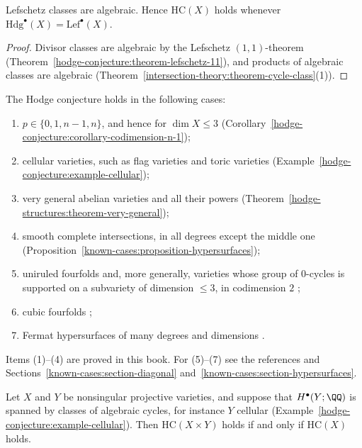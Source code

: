 \begin{proposition}\label{known-cases:proposition-lefschetz-classes}
Lefschetz classes are algebraic. Hence $\mathrm{HC}(X)$ holds whenever $\mathrm{Hdg}^\bullet(X) = \mathrm{Lef}^\bullet(X)$.
\end{proposition}

\begin{proof}
Divisor classes are algebraic by the Lefschetz $(1,1)$-theorem (Theorem~\ref{hodge-conjecture:theorem-lefschetz-11}), and products of algebraic classes are algebraic
(Theorem~\ref{intersection-theory:theorem-cycle-class}(1)).
\end{proof}

\begin{theorem}\label{known-cases:theorem-general}
The Hodge conjecture holds in the following cases:
\begin{enumerate}
\item $p \in \{0, 1, n - 1, n\}$, and hence for $\dim X \leq 3$ (Corollary~\ref{hodge-conjecture:corollary-codimension-n-1});
\item cellular varieties, such as flag varieties and toric varieties (Example~\ref{hodge-conjecture:example-cellular});
\item very general abelian varieties and all their powers (Theorem~\ref{hodge-structures:theorem-very-general});
\item smooth complete intersections, in all degrees except the middle one (Proposition~\ref{known-cases:proposition-hypersurfaces});
\item uniruled fourfolds \cite{conte-murre-1978} and, more generally, varieties whose group of $0$-cycles is supported on a subvariety of dimension $\leq 3$, in codimension $2$
\cite{bloch-srinivas-1983};
\item cubic fourfolds \cite{zucker-1977};
\item Fermat hypersurfaces of many degrees and dimensions \cite{shioda-1979}.
\end{enumerate}
\end{theorem}

Items (1)--(4) are proved in this book. For (5)--(7) see the references and Sections~\ref{known-cases:section-diagonal} and~\ref{known-cases:section-hypersurfaces}.

\begin{proposition}\label{known-cases:proposition-cellular-factor}
Let $X$ and $Y$ be nonsingular projective varieties, and suppose that $H^\bullet(Y; \QQ)$ is spanned by classes of algebraic cycles, for instance $Y$ cellular (Example~\ref{hodge-conjecture:example-cellular}). Then
$\mathrm{HC}(X \times Y)$ holds if and only if $\mathrm{HC}(X)$ holds.
\end{proposition}

